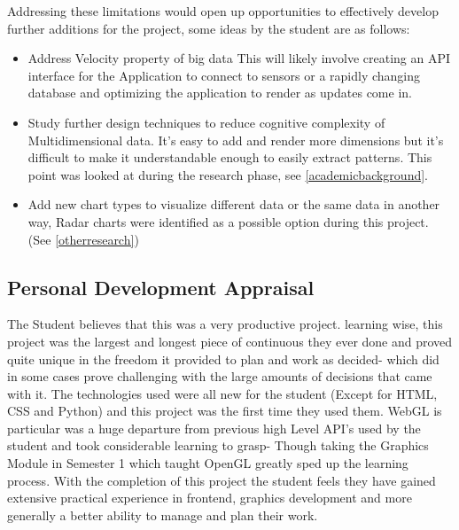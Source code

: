 Addressing these limitations would open up opportunities to effectively develop further additions for the project, some ideas by the student are as follows:

\begin{itemize}
    \item Address Velocity property of big data \cite{7918044} This will likely involve creating an API interface for the Application to connect to sensors or a rapidly changing database and optimizing the application to render as updates come in.
    \item Study further design techniques to reduce cognitive complexity of Multidimensional data. It's easy to add and render more dimensions but it's difficult to make it understandable enough to easily extract patterns. This point was looked at during the research phase, see \ref{academicbackground}.
    \item Add new chart types to visualize different data or the same data in another way, Radar charts were identified as a possible option during this project. (See \ref{otherresearch})
\end{itemize}

\subsection{Personal Development Appraisal}
The Student believes that this was a very productive project. learning wise, this project was the largest and longest piece of continuous they ever done and proved quite unique in the freedom it provided to plan and work as decided- which did in some cases prove challenging with the large amounts of decisions that came with it. The technologies used were all new for the student (Except for HTML, CSS and Python) and this project was the first time they used them. WebGL is particular was a huge departure from previous high Level API's used by the student and took considerable learning to grasp- Though taking the Graphics Module in Semester 1 which taught OpenGL greatly sped up the learning process.
With the completion of this project the student feels they have gained extensive practical experience in frontend, graphics development and more generally a better ability to  manage and plan their work.

